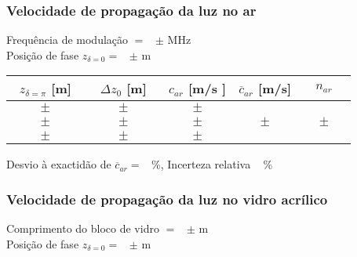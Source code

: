 \documentclass[a4paper,12pt]{article}  %
\begin{document}

\subsubsection{\sf Velocidade de propagação da luz no ar}

\noindent  Frequência de modulação $=$~\underline{\makebox[1cm][r]{~}} $\pm$ \underline{\makebox[1cm][r]{~}} MHz\\ %
\noindent  Posição de fase $z_{\delta=0}=$~\underline{\makebox[1cm][r]{~}} $\pm$ \underline{\makebox[1cm][r]{~}} m

\begin{center}
	\begin{tabular}{|c|c|c|c|c|}
	\hline
	 $z_{\delta=\pi}$  [m]    &  $\Delta z_0$ [m] & \quad $c_{ar}$  [m/s \quad ]& \quad  $\overline{c}_{ar}$ [m/s]	\quad  &\quad\quad   $n_{ar}$ \quad\quad   \\
	\hline \hline
	  $ \quad\quad \pm \quad\quad $ &  $ \quad\quad \pm \quad\quad $ & $ \quad \pm \quad $ &  & \\ \cline{1-3}
	  $ \quad\quad \pm \quad\quad $ &  $ \quad\quad \pm \quad\quad $ & $ \quad \pm \quad$ & $ \quad \pm \quad$  & $ \quad \pm \quad$ \\ \cline{1-3}
	  $ \quad\quad \pm \quad\quad $ &  $ \quad\quad \pm \quad\quad $ & $ \quad \pm \quad $ &  & \\ \hline
			\end{tabular}
\end{center}

\noindent Desvio à exactidão de $\overline{c}_{ar} =$~\underline{\makebox[1cm][r]{~}} \%, 
 Incerteza relativa  ~\underline{\makebox[1cm][r]{~}} \%


\newpage

\subsubsection{\sf Velocidade de propagação da luz no vidro acrílico}\label{sec:dados_ar}

\noindent Comprimento do bloco de vidro $=$~\underline{\makebox[1cm][r]{~}} $\pm$ \underline{\makebox[1cm][r]{~}} m  \\
\noindent  Posição de fase $z_{\delta=0}=$~\underline{\makebox[1cm][r]{~}} $\pm$ \underline{\makebox[1cm][r]{~}} m
\end{document}
